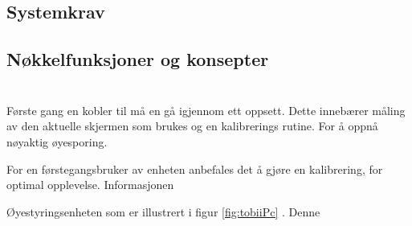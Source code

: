 \subsection{Systemkrav}

\subsection{Nøkkelfunksjoner og konsepter}

\section{}



Første gang en kobler til må en gå igjennom ett oppsett. Dette innebærer måling av den aktuelle skjermen som brukes og en kalibrerings rutine. For å oppnå nøyaktig øyesporing.  

For en førstegangsbruker av enheten anbefales det å gjøre en kalibrering, for optimal opplevelse. Informasjonen


Øyestyringsenheten som er illustrert i figur \ref{fig:tobiiPc}  . Denne
